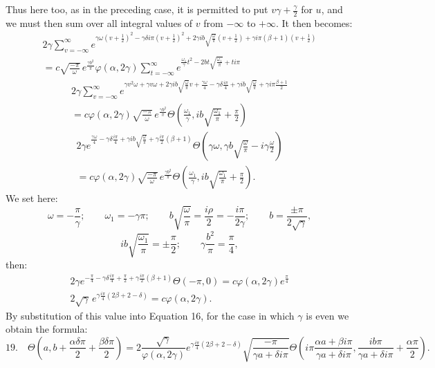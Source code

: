 \documentclass[10pt]{article}
\newcommand{\sourceanchor}[1]{\hypertarget{source-#1}{}}
\begin{document}
Thus here too, as in the preceding case, it is permitted to put \(v\gamma+\frac{\gamma}{2}\) for \(u\), and we must then sum over all integral values of \(v\) from \(-\infty\) to \(+\infty\). It then becomes:
\begin{multline*}
2\gamma\sum_{v=-\infty}^{\infty}
 e^{\gamma\omega\left(v+\frac12\right)^{2}-\gamma\delta i\pi\left(v+\frac12\right)^{2}
 +2\gamma ib\sqrt{\frac{\omega}{\pi}}\left(v+\frac12\right)+\gamma i\pi(\beta+1)\left(v+\frac12\right)}\\
=c\sqrt{\frac{-\pi}{\omega}}\,e^{\frac{\gamma b^{2}}{\pi}}\varphi(\alpha,2\gamma)
\sum_{t=-\infty}^{\infty}e^{\frac{\omega_{1}}{\gamma}t^{2}-2bt\sqrt{\frac{\omega_{1}}{\pi}}+ti\pi}
\end{multline*}
\begin{multline*}
2\gamma\sum_{v=-\infty}^{\infty}
 e^{\gamma v^{2}\omega+\gamma v\omega+2\gamma ib\sqrt{\frac{\omega}{\pi}}v+\frac{\gamma\omega}{4}
 -\gamma\delta\frac{i\pi}{4}+\gamma ib\sqrt{\frac{\omega}{\pi}}
 +\gamma i\pi\frac{\beta+1}{2}}\\
=c\varphi(\alpha,2\gamma)\sqrt{\frac{-\pi}{\omega}}\,e^{\frac{\gamma b^{2}}{\pi}}
\Theta\!\left(\frac{\omega_{1}}{\gamma}, ib\sqrt{\frac{\omega_{1}}{\pi}}+\frac{\pi}{2}\right)
\end{multline*}
\sourceanchor{PA16}
\begin{multline*}
2\gamma e^{\frac{\gamma\omega}{4}-\gamma\delta\frac{i\pi}{4}+\gamma ib\sqrt{\frac{\omega}{\pi}}+\gamma\frac{i\pi}{2}(\beta+1)}
\Theta\!\left(\gamma\omega,\gamma b\sqrt{\frac{\omega}{\pi}}-i\gamma\frac{\omega}{2}\right)\\
=c\varphi(\alpha,2\gamma)\sqrt{\frac{-\pi}{\omega}}\,e^{\frac{\gamma b^{2}}{\pi}}
\Theta\!\left(\frac{\omega_{1}}{\gamma},ib\sqrt{\frac{\omega_{1}}{\pi}}+\frac{\pi}{2}\right).
\end{multline*}
We set here:
\[
\omega=-\frac{\pi}{\gamma};\qquad \omega_{1}=-\gamma\pi;
\qquad b\sqrt{\frac{\omega}{\pi}}=\frac{i\rho}{2}=-\frac{i\pi}{2\gamma};
\qquad b=\frac{\pm\pi}{2\sqrt{\gamma}},
\]
\[
ib\sqrt{\frac{\omega_{1}}{\pi}}=\pm\frac{\pi}{2};
\qquad \gamma\frac{b^{2}}{\pi}=\frac{\pi}{4},
\]
then:
\begin{multline*}
2\gamma e^{-\frac{\pi}{4}-\gamma\delta\frac{i\pi}{4}+\frac{\pi}{2}+\gamma\frac{i\pi}{2}(\beta+1)}
\Theta(-\pi,0)=c\varphi(\alpha,2\gamma)e^{\frac{\pi}{4}}\\
2\sqrt{\gamma}\,e^{\gamma\frac{i\pi}{4}(2\beta+2-\delta)}=c\varphi(\alpha,2\gamma).
\end{multline*}
By substitution of this value into Equation 16, for the case in which \(\gamma\) is even we obtain the formula:
\begin{equation*}
19.\quad
\Theta\!\left(a,b+\frac{\alpha\delta\pi}{2}+\frac{\beta\delta\pi}{2}\right)
=2\frac{\sqrt{\gamma}}{\varphi(\alpha,2\gamma)}
 e^{\gamma\frac{i\pi}{4}(2\beta+2-\delta)}
\sqrt{\frac{-\pi}{\gamma a+\delta i\pi}}
\Theta\!\left(i\pi\frac{\alpha a+\beta i\pi}{\gamma a+\delta i\pi},
\frac{ib\pi}{\gamma a+\delta i\pi}+\frac{\alpha\pi}{2}\right).
\end{equation*}
\end{document}
